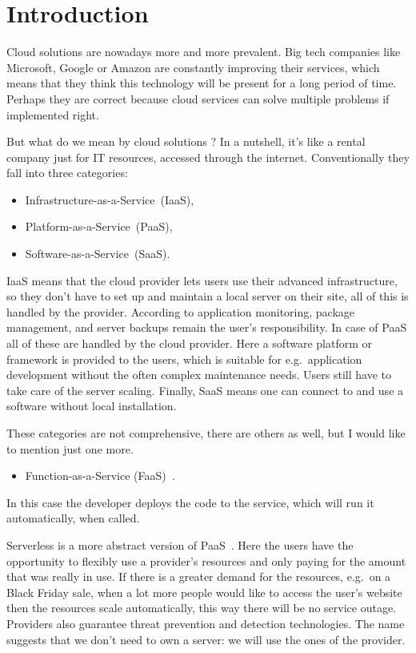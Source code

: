 \chapter{Introduction}\label{Introduction}

Cloud solutions are nowadays more and more prevalent. Big tech companies like Microsoft, Google or Amazon are constantly improving their services, which means that they think this technology will be present for a long period of time. Perhaps they are correct because cloud services can solve multiple problems if implemented right.

But what do we mean by cloud solutions \cite{CloudDef}? In a nutshell, it's like a rental company just for IT resources, accessed through the internet. Conventionally they fall into three categories: 
\begin{itemize}
	\item Infrastructure-as-a-Service~(IaaS),
	\item Platform-as-a-Service~(PaaS),
	\item Software-as-a-Service~(SaaS).
\end{itemize}

IaaS means that the cloud provider lets users use their advanced infrastructure, so they don't have to set up and maintain a local server on their site, all of this is handled by the provider. According to \cite{AzurePatterns} application monitoring, package management, and server backups remain the user's responsibility.
In case of PaaS all of these are handled by the cloud provider. Here a software platform or framework is provided to the users, which is suitable for e.g.\ application development without the often complex maintenance needs. Users still have to take care of the server scaling.
Finally, SaaS means one can connect to and use a software without local installation.

These categories are not comprehensive, there are others as well, but I would like to mention just one more.
\begin{itemize}
	\item Function-as-a-Service (FaaS)~\cite{FaaS}.
\end{itemize}
In this case the developer deploys the code to the service, which will run it automatically, when called.  

Serverless is a more abstract version of PaaS~\cite{ServerlessDef}. Here the users have the opportunity to flexibly use a provider's resources and only paying for the amount that was really in use. If there is a greater demand for the resources, e.g.\ on a Black Friday sale, when a lot more people would like to access the user's website then the resources scale automatically, this way there will be no service outage. Providers also guarantee threat prevention and detection technologies. The name suggests that we don't need to own a server: we will use the ones of the provider.

